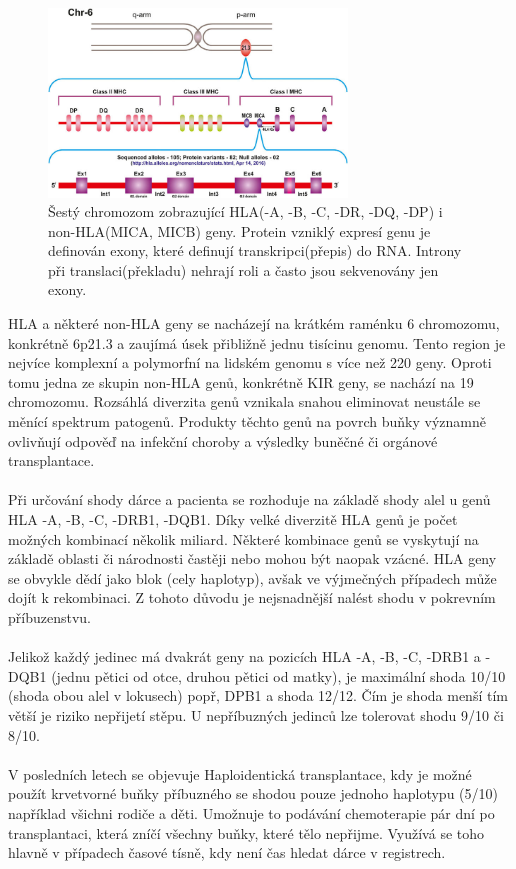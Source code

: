 \documentclass[czech,DP]{thesiskiv}
\numberwithin{equation}{section}
\begin{document}
\begin{figure}[H]		
		\centering
		\includegraphics[width=300px]{./img/genom6_mica.jpg}
		\caption{Šestý chromozom zobrazující HLA(-A, -B, -C, -DR, -DQ, -DP) i non-HLA(MICA, MICB) geny. Protein vzniklý expresí genu je definován exony, které definují transkripci(přepis) do RNA. Introny při translaci(překladu) nehrají roli a často jsou sekvenovány jen exony. \cite{chromozome6_mica} 
		}
		\label{fig:hla_genome}
\end{figure}

\noindent
HLA a některé non-HLA geny se nacházejí na krátkém raménku 6 chromozomu, konkrétně 6p21.3 a zaujímá úsek přibližně jednu tisícinu genomu. Tento region je nejvíce komplexní a polymorfní na lidském genomu s více než 220 geny. Oproti tomu jedna ze skupin non-HLA genů, konkrétně KIR geny, se nachází na 19 chromozomu. Rozsáhlá diverzita genů vznikala snahou eliminovat neustále se měnící spektrum patogenů. Produkty těchto genů na povrch buňky významně ovlivňují odpověď na infekční choroby a výsledky buněčné či orgánové transplantace. \cite{imgt_hla_database}
\\
\\
Při určování shody dárce a pacienta se rozhoduje na základě shody alel u genů HLA -A, -B, -C, -DRB1, -DQB1. Díky velké diverzitě HLA genů je počet možných kombinací několik miliard. Některé kombinace genů se vyskytují na základě oblasti či národnosti častěji nebo mohou být naopak vzácné. HLA geny se obvykle dědí jako blok (cely haplotyp), avšak ve výjmečných případech může dojít k rekombinaci. Z tohoto důvodu je nejsnadnější nalést shodu v pokrevním příbuzenstvu.
\\
\\
Jelikož každý jedinec má dvakrát geny na pozicích HLA -A, -B, -C, -DRB1 a -DQB1 (jednu pětici od otce, druhou pětici od matky), je maximální shoda 10/10 (shoda obou alel v lokusech) popř, DPB1 a shoda 12/12. Čím je shoda menší tím větší je riziko nepřijetí stěpu. U nepříbuzných jedinců lze tolerovat shodu 9/10 či 8/10. \cite{Frycova_bakalarka} \cite{KIR_transplantace_jindra}
\\
\\
V posledních letech se objevuje Haploidentická transplantace, kdy je možné použít krvetvorné buňky příbuzného se shodou pouze jednoho haplotypu (5/10) například všichni rodiče a děti. Umožnuje to podávání chemoterapie pár dní po transplantaci, která zníčí všechny buňky, které tělo nepřijme. Využívá se toho hlavně v případech časové tísně, kdy není čas hledat dárce v registrech. \cite{haploidenticka_transplantace}
\end{document}
